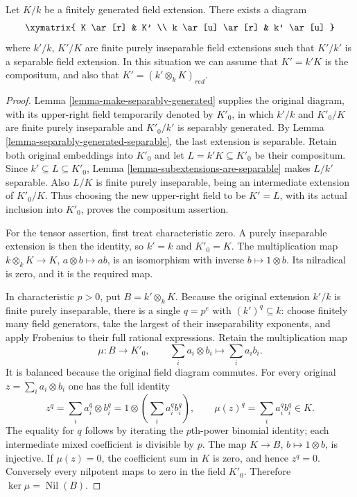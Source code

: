 \begin{lemma}
\label{lemma-make-separable}
Let $K/k$ be a finitely generated field extension.
There exists a diagram
$$
\xymatrix{
K \ar[r] & K' \\
k \ar[u] \ar[r] & k' \ar[u]
}
$$
where $k'/k$, $K'/K$ are finite purely inseparable field
extensions such that $K'/k'$ is a separable field extension.
In this situation we can assume that $K' = k'K$ is the compositum,
and also that $K' = (k' \otimes_k K)_{red}$.
\end{lemma}

\begin{proof}
Lemma \ref{lemma-make-separably-generated} supplies
the original diagram, with its upper-right field
temporarily denoted by $K'_0$, in which $k'/k$
and $K'_0/K$ are finite purely inseparable and
$K'_0/k'$ is separably generated. By Lemma
\ref{lemma-separably-generated-separable}, the last
extension is separable. Retain both original
embeddings into $K'_0$ and let $L=k'K\subseteq K'_0$
be their compositum. Since $k'\subseteq L\subseteq K'_0$,
Lemma \ref{lemma-subextensions-are-separable} makes
$L/k'$ separable. Also $L/K$ is finite purely
inseparable, being an intermediate extension of
$K'_0/K$. Thus choosing the new upper-right field
to be $K'=L$, with its actual inclusion into
$K'_0$, proves the compositum assertion.

For the tensor assertion, first treat characteristic
zero. A purely inseparable extension is then the
identity, so $k'=k$ and $K'_0=K$. The multiplication
map $k\otimes_k K\to K$, $a\otimes b\mapsto ab$,
is an isomorphism with inverse $b\mapsto1\otimes b$.
Its nilradical is zero, and it is the required map.

In characteristic $p>0$, put $B=k'\otimes_k K$.
Because the original extension $k'/k$ is finite
purely inseparable, there is a single $q=p^e$
with $(k')^q\subseteq k$: choose finitely many
field generators, take the largest of their
inseparability exponents, and apply Frobenius
to their full rational expressions. Retain
the multiplication map
$$
\mu:B\longrightarrow K'_0,\qquad
\sum_i a_i\otimes b_i\longmapsto\sum_i a_i b_i.
$$
It is balanced because the original field diagram
commutes. For every original $z=\sum_i a_i\otimes b_i$
one has the full identity
$$
z^q=\sum_i a_i^q\otimes b_i^q
=1\otimes\left(\sum_i a_i^q b_i^q\right),
\qquad
\mu(z)^q=\sum_i a_i^q b_i^q\in K.
$$
The equality for $q$ follows by iterating the
$p$th-power binomial identity; each intermediate
mixed coefficient is divisible by $p$. The map
$K\to B$, $b\mapsto1\otimes b$, is injective.
If $\mu(z)=0$, the coefficient sum in $K$ is
zero, and hence $z^q=0$. Conversely every
nilpotent maps to zero in the field $K'_0$.
Therefore $\ker\mu=\operatorname{Nil}(B)$.


\end{proof}
